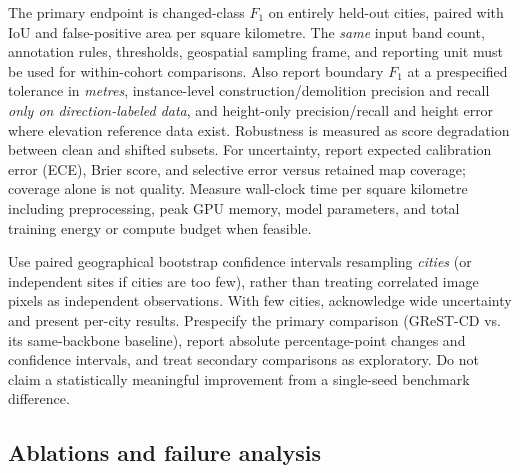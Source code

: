 The primary endpoint is changed-class $F_1$ on entirely held-out cities, paired with IoU and false-positive area per square kilometre. The \emph{same} input band count, annotation rules, thresholds, geospatial sampling frame, and reporting unit must be used for within-cohort comparisons. Also report boundary $F_1$ at a prespecified tolerance in \emph{metres}, instance-level construction/demolition precision and recall \emph{only on direction-labeled data}, and height-only precision/recall and height error where elevation reference data exist. Robustness is measured as score degradation between clean and shifted subsets. For uncertainty, report expected calibration error (ECE), Brier score, and selective error versus retained map coverage; coverage alone is not quality. Measure wall-clock time per square kilometre including preprocessing, peak GPU memory, model parameters, and total training energy or compute budget when feasible.

Use paired geographical bootstrap confidence intervals resampling \emph{cities} (or independent sites if cities are too few), rather than treating correlated image pixels as independent observations. With few cities, acknowledge wide uncertainty and present per-city results. Prespecify the primary comparison (GReST-CD vs. its same-backbone baseline), report absolute percentage-point changes and confidence intervals, and treat secondary comparisons as exploratory. Do not claim a statistically meaningful improvement from a single-seed benchmark difference.

\subsection{Ablations and failure analysis}

